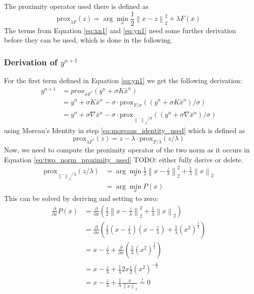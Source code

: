 \documentclass{paper}
\newcommand{\prox}{\text{prox}}
\newcommand{\twonorm}[1]{\left\lVert#1\right\rVert_2}
\begin{document}
The proximity operator used there is defined as 
\begin{equation}
	\prox_{\lambda F}(z) = \arg \min_x \frac{1}{2} \twonorm{x - z}^2 + \lambda F(x)
\end{equation}
The terms from Equation \eqref{eq:xn1} and \eqref{eq:yn1} need some further derivation
before they can be used, which is done in the following.

\subsubsection*{Derivation of $y^{n+1}$}
For the first term defined in Equation \eqref{eq:yn1} we get the following derivation:
\begin{align}
	y^{n+1} &= prox_{\sigma F^*}(y^n + \sigma K \bar{x}^n) \\
			&= y^n + \sigma K \bar{x}^n - 
				\sigma \cdot \prox_{F / \sigma}((y^n + \sigma K \bar{x}^n) / \sigma) 
				\label{eq:moreaus_identity_used} \\
			&= y^n + \sigma \nabla \bar{x}^n - 
				\sigma \cdot \prox_{\twonorm{\cdot} / \sigma}((y^n + \sigma \nabla \bar{x}^n) / \sigma)
				\label{eq:two_norm_proximity_used}
\end{align}
using Moreau's Identity in step \eqref{eq:moreaus_identity_used} which is defined as
\begin{equation}
	\prox_{\lambda F^*}(z) = z - \lambda \cdot \prox_{F/ \lambda}(z / \lambda) 
\end{equation}
Now, we need to compute the proximity operator of the two norm as it 
occurs in Equation \eqref{eq:two_norm_proximity_used} TODO: either fully derive or delete.
\begin{align}
	\prox_{\twonorm{\cdot} / \lambda}(z / \lambda) 
	&= \arg \min_x \frac{1}{2} \twonorm{x - \frac{z}{\lambda}}^2 +
	\frac{1}{\lambda} \twonorm{x} \\
	\label{eq:P_x}
	&= \arg \min_x P(x)
\end{align}
This can be solved by deriving and setting to zero:
\begin{align*}
\frac{\partial}{\partial x} P(x) &= 
	\frac{\partial}{\partial x} \left(
 		\frac{1}{2} \twonorm{x - \frac{z}{\lambda}}^2 +
		\frac{1}{\lambda} \twonorm{x} 
	\right) \\
&= 
	\frac{\partial}{\partial x} \left(
		\frac{1}{2} (x-\frac{z}{\lambda}) (x-\frac{z}{\lambda}) + 
		\frac{1}{\lambda} (x^2)^{\frac{1}{2}}
	\right) \\
&= 
	x-\frac{z}{\lambda} + 
	\frac{\partial}{\partial x} \left(
		\frac{1}{\lambda} (x^2)^{\frac{1}{2}}
	\right) \\
&= 
	x-\frac{z}{\lambda} + 
	\frac{1}{\lambda} 2x \frac{1}{2} (x^2)^{-\frac{1}{2}} \\
&= 
	x-\frac{z}{\lambda} + 
	\frac{1}{\lambda} \frac{x}{\twonorm{x}} \overset{!}{=} 0 
	\label{eq:proximity_operator_l2_norm_fail}
\end{align*}
\end{document}
